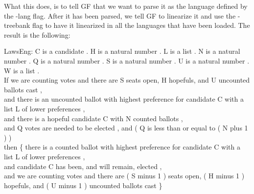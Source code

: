 What this does, is to tell GF that we want to parse it as the language defined by the -lang flag. After it has been parsed, we tell GF to linearize it  and use the -treebank flag to have it linearized in all the languages that have been loaded. The result is the following:
\begin{texto2}
LawsEng: C is a candidate . H is a natural number . L is a list . N is a natural number . Q is a natural number . S is a natural number . U is a natural number . W is a list . \\
If we are counting votes and there are S seats open, H hopefuls, and U uncounted ballots cast , \\
and there is an uncounted ballot with highest preference for candidate C with a list L of lower preferences , \\
and there is a hopeful candidate C with N counted ballots , \\
and Q votes are needed to be elected , and ( Q is less than or equal to ( N plus 1 ) ) \\
then \{ there is a counted ballot with highest preference for candidate C with a list L of lower preferences , \\
and candidate C has been, and will remain, elected , \\
and we are counting votes and there are ( S minus 1 ) seats open, ( H minus 1 ) hopefuls, and ( U minus 1 ) uncounted ballots cast \}
\end{texto2}